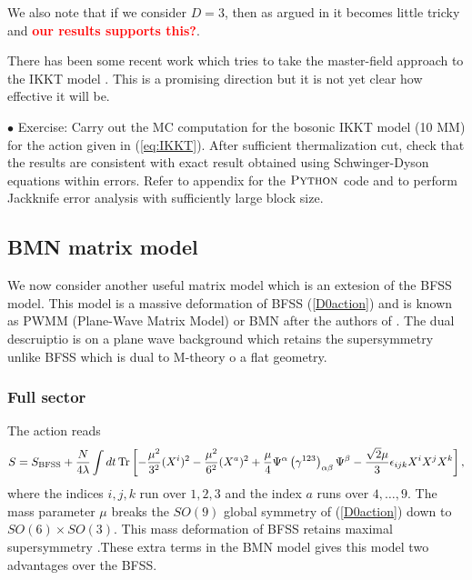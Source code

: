 \documentclass[11pt]{article}
\newcommand{\TODO}[1]{\textcolor{red}{{\bf #1}}}
\begin{document}
We also note that if we consider $D=3$, then as argued in 
\cite{Hotta:1998en} it becomes little tricky and
\TODO{our results supports this?}. 


There has been some recent work which tries to take the master-field approach to the
IKKT model \cite{Klinkhamer:2021wrv}. This is a promising direction 
but it is not yet clear how effective it will be.  


\vspace{10mm} 

\begin{mdframed}[backgroundcolor=blue!3] 
	\textsc{} 
	$\bullet$ Exercise: Carry out the MC computation for the bosonic IKKT model (10 MM) for the action given in (\ref{eq:IKKT}). After sufficient thermalization cut, check that the results are consistent with exact result obtained using Schwinger-Dyson equations within errors. Refer to appendix for the $\textsc{Python}$ code and to perform Jackknife error analysis with sufficiently large block size. 
\end{mdframed} 


\subsection{BMN matrix model}

We now consider another useful matrix model which is an extesion of the BFSS model. This model is a massive deformation of BFSS (\ref{D0action}) and is known as PWMM (Plane-Wave Matrix Model) 
or BMN after the authors of \cite{Berenstein:2002jq}. The dual descruiptio is on a plane wave background which retains the supersymmetry unlike BFSS which is dual to M-theory o a flat geometry.


\subsubsection{Full sector}

The action reads 
\begin{equation}
	S = S_{\rm{BFSS}} + \frac{N}{4\lambda} \int dt \,\mbox{Tr} \left[
	-\frac{\mu^2}{ 3^2} ( X^i)^2
	-\frac{\mu^2}{ 6^2} (X^a)^2 +
	\frac{\mu}{4}\Psi^\alpha \left(\gamma^{123}\right)_{\alpha \beta} \Psi^\beta 
	- \frac{\sqrt{2}\mu}{3} \epsilon_{ijk} X^iX^jX^k \right] ,
	\label{PWMMaction}
\end{equation}
where the indices $i,j,k$ run over $1,2,3$ and the index $a$ runs over $4,\dots,9$.
The mass parameter $\mu$ breaks the $SO(9)$ global symmetry of (\ref{D0action}) down to $SO(6)\times SO(3)$. 
This mass deformation of BFSS retains maximal supersymmetry \cite{Berenstein:2002jq}.These extra terms in the BMN model gives this model two advantages over the BFSS. 
\end{document}
